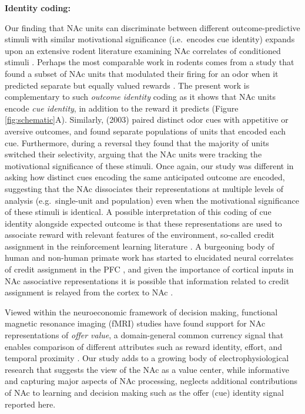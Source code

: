 \documentclass[11pt]{article}
\let\cite=\citep
\begin{document}
{\bf Identity coding:}

Our finding that NAc units can discriminate between different outcome-predictive stimuli with similar motivational significance (i.e.\ encodes cue identity) expands upon an extensive rodent literature examining NAc correlates of conditioned stimuli \cite{Setlow2003,Nicola2004,Yun2004,Roitman2005,Day2006,Ambroggi2008,Ishikawa2008,Roesch2009a,Saddoris2011,Goldstein2012,Lansink2012,Bissonette2013,McGinty2013,Atallah2014,Sugam2014,Cooch2015,West2016,Dejean2017}. Perhaps the most comparable work in rodents comes from a study that found a subset of NAc units that modulated their firing for an odor when it predicted separate but equally valued rewards \cite{Cooch2015}. The present work is complementary to such {\it outcome identity} coding as it shows that NAc units encode {\it cue identity}, in addition to the reward it predicts (Figure \ref{fig:schematic}A). Similarly, \citeauthor{Setlow2003} (2003) paired distinct odor cues with appetitive or aversive outcomes, and found separate populations of units that encoded each cue. Furthermore, during a reversal they found that the majority of units switched their selectivity, arguing that the NAc units were tracking the motivational significance of these stimuli. Once again, our study was different in asking how distinct cues encoding the same anticipated outcome are encoded, suggesting that the NAc dissociates their representations at multiple levels of analysis (e.g.\ single-unit and population) even when the motivational significance of these stimuli is identical. A possible interpretation of this coding of cue identity alongside expected outcome is that these representations are used to associate reward with relevant features of the environment, so-called credit assignment in the reinforcement learning literature \cite{sutton1998}. A burgeoning body of human and non-human primate work has started to elucidated neural correlates of credit assignment in the PFC \cite{Chau2015,Akaishi2016,Asaad2017,Noonan2017}, and given the importance of cortical inputs in NAc associative representations it is possible that information related to credit assignment is relayed from the cortex to NAc \cite{Ishikawa2008,Cooch2015}.

Viewed within the neuroeconomic framework of decision making, functional magnetic resonance imaging (fMRI) studies have found support for NAc representations of {\it offer value}, a domain-general common currency signal that enables comparison of different attributes such as reward identity, effort, and temporal proximity \cite{Peters2009,Levy2012,Bartra2013,Sescousse2015}. Our study adds to a growing body of electrophysiological research that suggests the view of the NAc as a value center, while informative and capturing major aspects of NAc processing, neglects additional contributions of NAc to learning and decision making such as the offer (cue) identity signal reported here.
\end{document}
